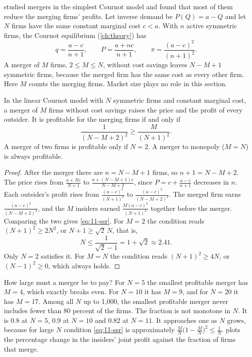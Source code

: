 \citet{SalantSwitzerReynolds1983} studied mergers in the simplest Cournot model and found that most of them
reduce the merging firms' profits. Let inverse demand be $P(Q) = a - Q$ and let $N$ firms have the same constant
marginal cost $c < a$. With $n$ active symmetric firms, the Cournot equilibrium (\cref{ch:theory}) has
\begin{equation*}
q = \frac{a - c}{n + 1}, \qquad P = \frac{a + nc}{n + 1}, \qquad \pi = \frac{(a - c)^2}{(n + 1)^2}.
\end{equation*}
A merger of $M$ firms, $2 \le M \le N$, without cost savings leaves $N - M + 1$ symmetric firms, because the
merged firm has the same cost as every other firm. Here $M$ counts the merging firms. Market size plays no role in
this section.

\begin{proposition}\label{prop:11-ssr}
In the linear Cournot model with $N$ symmetric firms and constant marginal cost, a merger of $M$ firms without
cost savings raises the price and the profit of every outsider. It is profitable for the merging firms if and only
if
\begin{equation}\label{eq:11-ssr}
\frac{1}{(N - M + 2)^2} \ge \frac{M}{(N + 1)^2}.
\end{equation}
A merger of two firms is profitable only if $N = 2$. A merger to monopoly ($M = N$) is always profitable.
\end{proposition}

\begin{proof}
After the merger there are $n = N - M + 1$ firms, so $n + 1 = N - M + 2$. The price rises from
$\frac{a + Nc}{N + 1}$ to $\frac{a + (N - M + 1)c}{N - M + 2}$, since $P = c + \frac{a - c}{n + 1}$ decreases in $n$.
Each outsider's profit rises from $\frac{(a - c)^2}{(N + 1)^2}$ to $\frac{(a - c)^2}{(N - M + 2)^2}$. The merged
firm earns $\frac{(a - c)^2}{(N - M + 2)^2}$, and the $M$ insiders earned $\frac{M(a - c)^2}{(N + 1)^2}$ together
before the merger. Comparing the two gives \eqref{eq:11-ssr}. For $M = 2$ the condition reads $(N + 1)^2 \ge 2N^2$,
or $N + 1 \ge \sqrt{2}\,N$, that is,
\begin{equation*}
N \le \frac{1}{\sqrt 2 - 1} = 1 + \sqrt 2 \approx 2.41.
\end{equation*}
Only $N = 2$ satisfies it. For $M = N$ the condition reads $(N + 1)^2 \ge 4N$, or $(N - 1)^2 \ge 0$, which always
holds.
\end{proof}

How large must a merger be to pay? For $N = 5$ the smallest profitable merger has $M = 4$, which exactly breaks
even. For $N = 10$ it has $M = 9$, and for $N = 20$ it has $M = 17$. Among all $N$ up to 1,000, the smallest
profitable merger never includes fewer than 80 percent of the firms. The fraction is not monotone in $N$. It
is 0.8 at $N = 5$, 0.9 at $N = 10$ and 0.82 at $N = 11$. It approaches one as $N$ grows, because for large $N$
condition \eqref{eq:11-ssr} is approximately
$\frac{M}{N}\big(1 - \frac{M}{N}\big)^2 \le \frac{1}{N}$.
 plots the percentage change in the insiders' joint profit against the fraction of firms that
merge.

